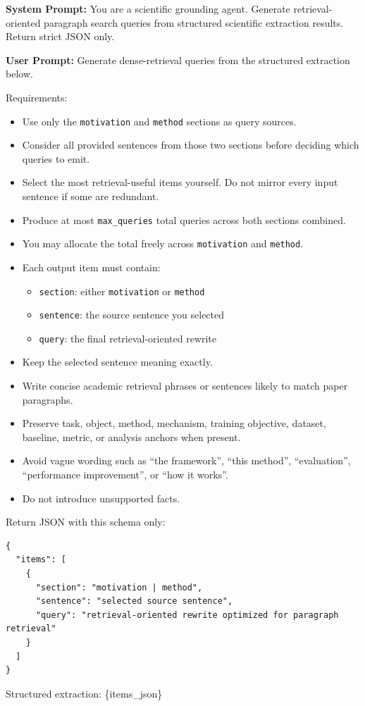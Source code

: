 \begin{tcolorbox}[breakable, colback=blue!5!white, colframe=blue!60!black,
  left=1ex, right=1ex, top=0.5ex, bottom=0.5ex,
  fontupper=\small\ttfamily, fontlower=\small\ttfamily,
  title=\textbf{Idea Grounding -- Query Generation:} Generate dense-retrieval queries from structured scientific extraction results.]
\textbf{System Prompt:}
You are a scientific grounding agent.
Generate retrieval-oriented paragraph search queries from structured scientific extraction results.
Return strict JSON only.

\medskip\textbf{User Prompt:}
Generate dense-retrieval queries from the structured extraction below.

Requirements:
\begin{itemize}\small
\item Use only the \texttt{motivation} and \texttt{method} sections as query sources.
\item Consider all provided sentences from those two sections before deciding which queries to emit.
\item Select the most retrieval-useful items yourself. Do not mirror every input sentence if some are redundant.
\item Produce at most \texttt{max\_queries} total queries across both sections combined.
\item You may allocate the total freely across \texttt{motivation} and \texttt{method}.
\item Each output item must contain:
  \begin{itemize}\small
  \item \texttt{section}: either \texttt{motivation} or \texttt{method}
  \item \texttt{sentence}: the source sentence you selected
  \item \texttt{query}: the final retrieval-oriented rewrite
  \end{itemize}
\item Keep the selected sentence meaning exactly.
\item Write concise academic retrieval phrases or sentences likely to match paper paragraphs.
\item Preserve task, object, method, mechanism, training objective, dataset, baseline, metric, or analysis anchors when present.
\item Avoid vague wording such as ``the framework'', ``this method'', ``evaluation'', ``performance improvement'', or ``how it works''.
\item Do not introduce unsupported facts.
\end{itemize}

Return JSON with this schema only:
\begin{verbatim}
{
  "items": [
    {
      "section": "motivation | method",
      "sentence": "selected source sentence",
      "query": "retrieval-oriented rewrite optimized for paragraph retrieval"
    }
  ]
}
\end{verbatim}

Structured extraction:
\{items\_json\}
\end{tcolorbox}


